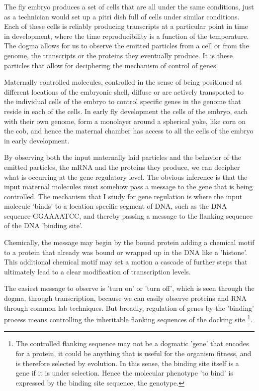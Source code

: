 The fly embryo produces a set of cells that are all under the same conditions, just as a technician would set up a pitri dish full of cells under similar conditions.  Each of these cells is reliably producing transcripts at a particular point in time in development, where the time reproducibility is a function of the temperature.  The dogma allows for us to observe the emitted particles from a cell or from the genome, the transcripts or the proteins they eventually produce.  It is these particles that allow for deciphering the mechanism of control of genes.   

  
Maternally controlled molecules, controlled in the sense of being positioned at different locations of the embryonic shell, diffuse or are actively transported to the individual cells of the embryo to control specific genes in the genome that reside in each of the cells.  In early fly development the cells of the embryo, each with their own genome, form a monolayer around a spherical yoke, like corn on the cob, and hence the maternal chamber has access to all the cells of the embryo in early development.  

By observing both the input maternally laid particles and the behavior of the emitted particles, the mRNA and the proteins they produce, we can decipher what is occurring at the gene regulatory level.  The obvious inference is that the input maternal molecules must somehow pass a message to the gene that is being controlled.  The mechanism that I study for gene regulation is where the input molecule 'binds' to a location specific segment of DNA, such as the DNA sequence GGAAAATCC, and thereby passing a message to the flanking sequence of the DNA 'binding site'.

Chemically, the message may begin by the bound protein adding a chemical motif to a protein that already was bound or wrapped up in the DNA like a 'histone'.  This additional chemical motif may set a motion a cascade of further steps that ultimately lead to a clear modification of transcription levels.
  
  The easiest message to observe is 'turn on' or 'turn off', which is seen through the dogma, through transcription, because we can easily observe proteins and RNA through common lab techniques. But broadly, regulation of genes by the 'binding' process means controlling the inheritable flanking sequences of the docking site \footnote{The controlled flanking sequence may not be a dogmatic 'gene' that encodes for a protein, it could be anything that is useful for the organism fitness, and is therefore selected by evolution.  In this sense, the binding site itself is a gene if it is under selection.  Hence the molecular phenotype 'to bind' is expressed by the binding site sequence, the genotype.  }.
  
